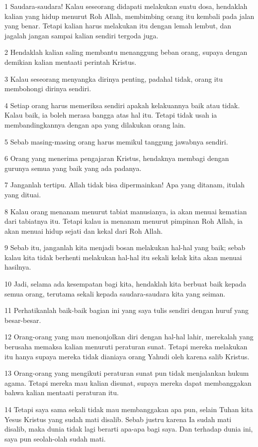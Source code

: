 \par 1 Saudara-saudara! Kalau seseorang didapati melakukan suatu dosa, hendaklah kalian yang hidup menurut Roh Allah, membimbing orang itu kembali pada jalan yang benar. Tetapi kalian harus melakukan itu dengan lemah lembut, dan jagalah jangan sampai kalian sendiri tergoda juga.
\par 2 Hendaklah kalian saling membantu menanggung beban orang, supaya dengan demikian kalian mentaati perintah Kristus.
\par 3 Kalau seseorang menyangka dirinya penting, padahal tidak, orang itu membohongi dirinya sendiri.
\par 4 Setiap orang harus memeriksa sendiri apakah kelakuannya baik atau tidak. Kalau baik, ia boleh merasa bangga atas hal itu. Tetapi tidak usah ia membandingkannya dengan apa yang dilakukan orang lain.
\par 5 Sebab masing-masing orang harus memikul tanggung jawabnya sendiri.
\par 6 Orang yang menerima pengajaran Kristus, hendaknya membagi dengan gurunya semua yang baik yang ada padanya.
\par 7 Janganlah tertipu. Allah tidak bisa dipermainkan! Apa yang ditanam, itulah yang dituai.
\par 8 Kalau orang menanam menurut tabiat manusianya, ia akan menuai kematian dari tabiatnya itu. Tetapi kalau ia menanam menurut pimpinan Roh Allah, ia akan menuai hidup sejati dan kekal dari Roh Allah.
\par 9 Sebab itu, janganlah kita menjadi bosan melakukan hal-hal yang baik; sebab kalau kita tidak berhenti melakukan hal-hal itu sekali kelak kita akan menuai hasilnya.
\par 10 Jadi, selama ada kesempatan bagi kita, hendaklah kita berbuat baik kepada semua orang, terutama sekali kepada saudara-saudara kita yang seiman.
\par 11 Perhatikanlah baik-baik bagian ini yang saya tulis sendiri dengan huruf yang besar-besar.
\par 12 Orang-orang yang mau menonjolkan diri dengan hal-hal lahir, merekalah yang berusaha memaksa kalian menuruti peraturan sunat. Tetapi mereka melakukan itu hanya supaya mereka tidak dianiaya orang Yahudi oleh karena salib Kristus.
\par 13 Orang-orang yang mengikuti peraturan sunat pun tidak menjalankan hukum agama. Tetapi mereka mau kalian disunat, supaya mereka dapat membanggakan bahwa kalian mentaati peraturan itu.
\par 14 Tetapi saya sama sekali tidak mau membanggakan apa pun, selain Tuhan kita Yesus Kristus yang sudah mati disalib. Sebab justru karena Ia sudah mati disalib, maka dunia tidak lagi berarti apa-apa bagi saya. Dan terhadap dunia ini, saya pun seolah-olah sudah mati.
